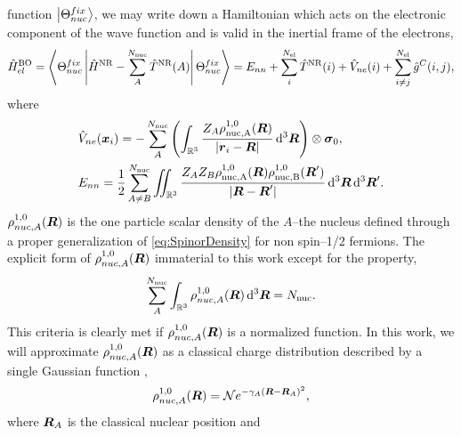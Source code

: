 function $\left\vert \Theta_{nuc}^{fix} \right\rangle$, we may write down a Hamiltonian which acts on the electronic 
component of the wave function and is valid in the inertial frame of the electrons,
\begin{equation}
\label{eq:NRBOH}
\hat{H}^{\mathrm{BO}}_{el} = \left\langle \Theta_{nuc}^{fix} \left\vert \hat{H}^{\mathrm{NR}} - \sum_A^{N_\mathrm{nuc}}\hat{T}^{\mathrm{NR}}(A) \right\vert \Theta_{nuc}^{fix} \right\rangle
=E_{nn} + \sum_i^{N_\mathrm{el}} \hat{T}^{\mathrm{NR}}(i) + \hat{V}_{ne}(i) + \sum_{i\neq j}^{N_\mathrm{el}} \hat{g}^C(i,j),
\end{equation}
where
\begin{align}
  &\hat{V}_{ne}(\boldsymbol{x}_i) = 
    -\sum^{N_\mathrm{nuc}}_A \left(\int_{\mathbb R^3} \frac{Z_A\rho^{1,0}_\mathrm{nuc,A}(\boldsymbol{R})}{\vert \boldsymbol{r}_i - \boldsymbol{R} \vert} \,\mathrm{d}^3\boldsymbol{R}\right) \otimes \boldsymbol{\sigma}_{0}, \label{eq:Vne}\\
&E_{nn} = \frac{1}{2} \sum^{N_\mathrm{nuc}}_{A\neq B} \int\mkern-12mu\int_{\mathbb R^3} \frac{Z_AZ_B\rho^{1,0}_\mathrm{nuc,A}(\boldsymbol{R})\rho^{1,0}_\mathrm{nuc,B}(\boldsymbol{R}')}{\vert \boldsymbol{R} - \boldsymbol{R}' \vert} \,\mathrm{d}^3\boldsymbol{R} \,\mathrm{d}^3\boldsymbol{R}'.
\end{align}
$\rho^{1,0}_{nuc,A}(\boldsymbol{R})$ is the one particle scalar density of the $A$--the nucleus defined through a proper generalization of
\cref{eq:SpinorDensity} for non spin--1/2 fermions. The explicit form of $\rho^{1,0}_{nuc,A}(\boldsymbol{R})$ immaterial
to this work except for the property,
\begin{equation}
\sum_A^{N_\mathrm{nuc}} \int_{\mathbb R^3} \rho_{nuc,A}^{1,0}(\boldsymbol{R}) \,\mathrm{d}^3\boldsymbol{R} = N_\mathrm{nuc}.
\end{equation}
This criteria is clearly met if $\rho^{1,0}_{nuc,A}(\boldsymbol{R})$ is a normalized function. In this work, we will approximate
$\rho^{1,0}_{nuc,A}(\boldsymbol{R})$ as a classical charge distribution described by a single Gaussian function ,
\begin{equation}
\rho^{1,0}_{nuc,A}(\boldsymbol{R}) = \mathcal{N} e^{-\gamma_A(\boldsymbol{R} - \boldsymbol{R}_A)^2},
\end{equation}
where $\boldsymbol{R}_A$ is the classical nuclear position and 





